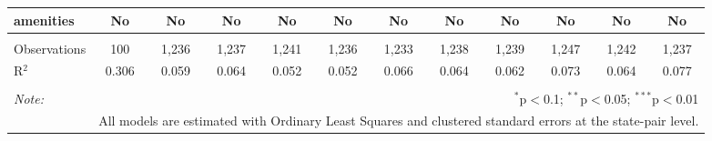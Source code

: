 \begin{table}[!htbp]
\begin{tabular}{@{\extracolsep{5pt}}lccccccccccc}
amenities & No & No & No & No & No & No & No & No & No & No & No \\ 
\hline \\[-1.8ex] 
Observations & 100 & 1,236 & 1,237 & 1,241 & 1,236 & 1,233 & 1,238 & 1,239 & 1,247 & 1,242 & 1,237 \\ 
R$^{2}$ & 0.306 & 0.059 & 0.064 & 0.052 & 0.052 & 0.066 & 0.064 & 0.062 & 0.073 & 0.064 & 0.077 \\ 
\hline 
\hline \\[-1.8ex] 
\textit{Note:}  & \multicolumn{11}{r}{$^{*}$p$<$0.1; $^{**}$p$<$0.05; $^{***}$p$<$0.01} \\ 
 & \multicolumn{11}{r}{All models are estimated with Ordinary Least Squares and clustered standard errors at the state-pair level.} \\ 
\end{tabular} 
\end{table} 
